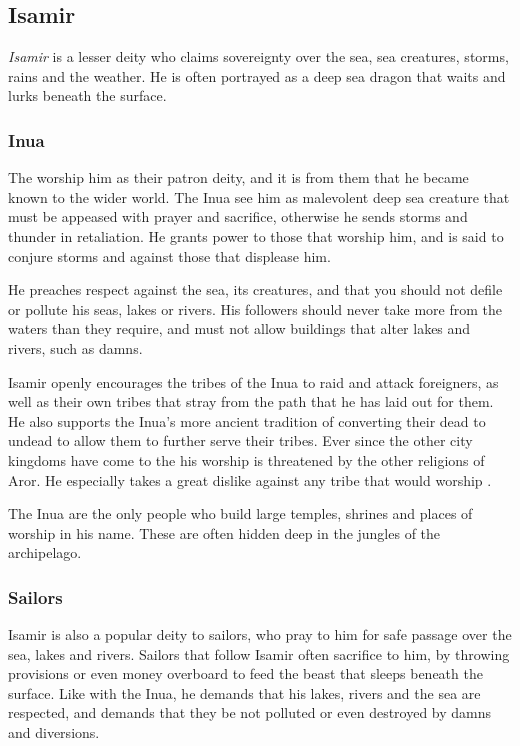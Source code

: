 \subsection{Isamir}
\label{sec:Isamir}

\emph{Isamir} is a lesser deity who claims sovereignty over the sea, sea
creatures, storms, rains and the weather. He is often portrayed as a deep
sea dragon that waits and lurks beneath the surface.

\subsubsection{Inua}

The  worship him as their patron deity, and it is from
them that he became known to the wider world. The Inua see him as malevolent
deep sea creature that must be appeased with prayer and sacrifice, otherwise
he sends storms and thunder in retaliation. He grants power to those that
worship him, and is said to conjure storms and against those that displease
him.

He preaches respect against the sea, its creatures, and that you should not
defile or pollute his seas, lakes or rivers. His followers should never take
more from the waters than they require, and must not allow buildings that
alter lakes and rivers, such as damns.

Isamir openly encourages the tribes of the Inua to raid and attack foreigners,
as well as their own tribes that stray from the path that he has laid out for
them. He also supports the Inua's more ancient tradition of converting their
dead to undead to allow them to further serve their tribes. Ever since the
other city kingdoms have come to the  his
worship is threatened by the other religions of Aror. He especially takes a
great dislike against any tribe that would worship .

The Inua are the only people who build large temples, shrines and places of
worship in his name. These are often hidden deep in the jungles of the
archipelago.

\subsubsection{Sailors}

Isamir is also a popular deity to sailors, who pray to him for safe passage
over the sea, lakes and rivers. Sailors that follow Isamir often sacrifice
to him, by throwing provisions or even money overboard to feed the beast
that sleeps beneath the surface. Like with the Inua, he demands that his
lakes, rivers and the sea are respected, and demands that they be not
polluted or even destroyed by damns and diversions.

